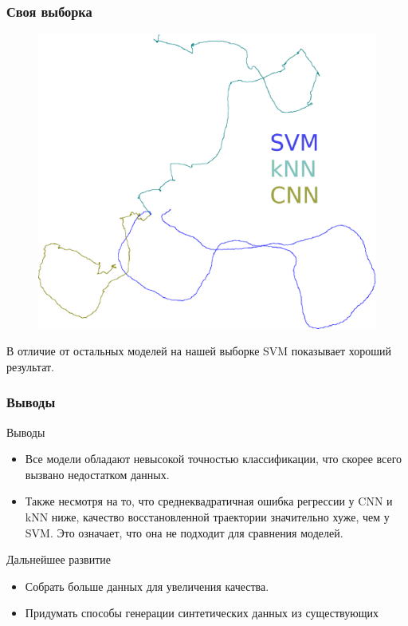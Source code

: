 \documentclass{beamer}
\begin{document}
\begin{frame}
\frametitle{Своя выборка} %

\begin{figure}[h]
\centering
\includegraphics[scale=0.3]{images/traj.eps}
\end{figure}
В отличие от остальных моделей на нашей выборке SVM показывает хороший результат.

\end{frame}

\begin{frame}
\frametitle{Выводы}
\begin{block}{Выводы}
\begin{itemize}
\item Все модели обладают невысокой точностью классификации, что скорее всего вызвано недостатком данных.
\item Также несмотря на то, что среднеквадратичная ошибка регрессии у CNN и kNN ниже, качество восстановленной траектории значительно хуже, чем у SVM.
Это означает, что она не подходит для сравнения моделей.
\end{itemize}
\end{block}

\begin{block}{Дальнейшее развитие}
    \begin{itemize}
    \item Собрать больше данных для увеличения качества.
    \item Придумать способы генерации синтетических данных из существующих
    \end{itemize}
\end{block}
\end{frame}



\end{document}
